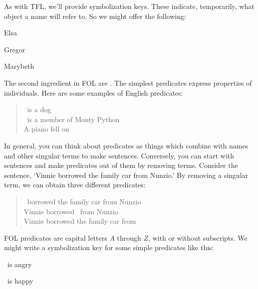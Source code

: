 As with TFL, we'll provide symbolization keys. These indicate, temporarily, what object a name will refer to. So we might offer the following:
	\begin{ekey}
		\item[e] Elsa
		\item[g] Gregor
		\item[m] Marybeth
	\end{ekey}

The second ingredient in FOL are .   The simplest predicates express properties of individuals. Here are some examples of English predicates:
	\begin{quote}
		\blank\ is a dog\\
		\blank\ is a member of Monty Python\\
		A piano fell on \blank
	\end{quote}
In general, you can think about predicates as things which combine with names and other singular terms to make sentences. Conversely, you can start with sentences and make predicates out of them by removing terms. Consider the sentence, `Vinnie borrowed the family car from Nunzio.' By removing a singular term, we can obtain three different predicates:
	\begin{quote}
		\blank\ borrowed the family car from Nunzio\\
		Vinnie borrowed \blank\ from Nunzio\\
		Vinnie borrowed the family car from \blank
	\end{quote}
FOL predicates are capital letters $A$ through $Z$, with or without subscripts. We might write a symbolization key for some simple predicates  like this:
	\begin{ekey}
		\item[A] \blank\ is angry
		\item[H] \blank\ is happy
	\end{ekey}

